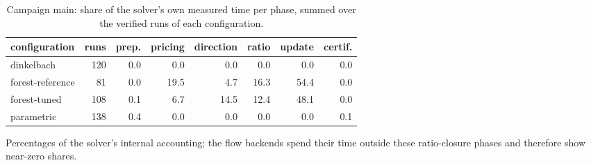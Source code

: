 \begin{table}[tbp]
\centering
\caption{Campaign main: share of the solver's own measured time per phase, summed over the verified runs of each configuration.}
\label{tab:main-breakdown}
\small
\begin{adjustbox}{max width=\textwidth}
\begin{tabular}{lrrrrrrr}
\toprule
configuration & runs & prep. & pricing & direction & ratio & update & certif. \\
\midrule
dinkelbach & 120 & 0.0 & 0.0 & 0.0 & 0.0 & 0.0 & 0.0 \\
forest-reference & 81 & 0.0 & 19.5 & 4.7 & 16.3 & 54.4 & 0.0 \\
forest-tuned & 108 & 0.1 & 6.7 & 14.5 & 12.4 & 48.1 & 0.0 \\
parametric & 138 & 0.4 & 0.0 & 0.0 & 0.0 & 0.0 & 0.1 \\
\bottomrule
\end{tabular}
\end{adjustbox}
\par\vspace{2pt}\footnotesize Percentages of the solver's internal accounting; the flow backends spend their time outside these ratio-closure phases and therefore show near-zero shares.
\end{table}
